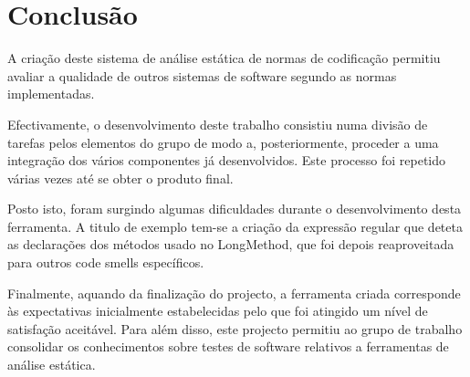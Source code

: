 \chapter{Conclusão}

\par A criação deste sistema de análise estática de normas de codificação permitiu avaliar a qualidade de outros sistemas de software segundo as normas implementadas.
\par Efectivamente, o desenvolvimento deste trabalho consistiu numa divisão de tarefas pelos elementos do grupo de modo a, posteriormente, proceder a uma integração dos vários componentes já desenvolvidos. Este processo foi repetido várias vezes até se obter o produto final.
\par Posto isto, foram surgindo algumas dificuldades durante o desenvolvimento desta ferramenta. A titulo de exemplo tem-se a criação da expressão regular que deteta as declarações dos métodos usado no LongMethod, que foi depois reaproveitada para outros code smells específicos.
\par Finalmente, aquando da finalização do projecto, a ferramenta criada corresponde às expectativas inicialmente estabelecidas pelo que foi atingido um nível de satisfação aceitável. Para além disso, este projecto permitiu ao grupo de trabalho consolidar os conhecimentos sobre testes de software relativos a ferramentas de análise estática.
